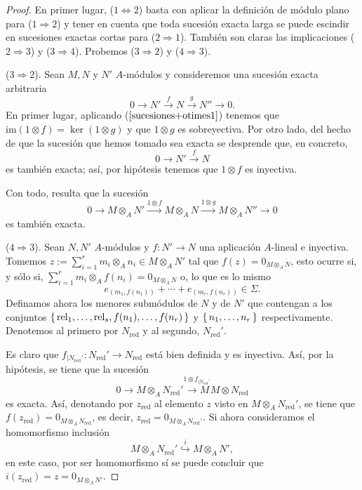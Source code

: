 \documentclass[../main.tex]{subfiles}
\begin{document}
\begin{proof}
	En primer lugar, ($1\Leftrightarrow 2$) basta con aplicar la definición de módulo plano para ($1\Rightarrow2$) y tener en cuenta que toda sucesión exacta larga se puede escindir en sucesiones exactas cortas para ($2\Rightarrow1$). También son claras las implicaciones ($2\Rightarrow3$) y ($3\Rightarrow4$). Probemos ($3\Rightarrow2$) y ($4\Rightarrow3$).
	
	($3\Rightarrow2$). Sean $M,N$ y $N'$ $A$-módulos y consideremos una sucesión exacta arbitraria $$0\longrightarrow N'\overset{f}{\longrightarrow}N\overset{g}{\longrightarrow}N''\longrightarrow 0.$$
	En primer lugar, aplicando ($\ref{sucesiones+otimes1}$) tenemos que $\text{im}(1\otimes f)=\ker{(1\otimes g)}$ y que $1\otimes g$ es sobreyectiva. Por otro lado, del hecho de que la sucesión que hemos tomado sea exacta se desprende que, en concreto,$$0\longrightarrow N'\overset{f}{\longrightarrow}N$$es también exacta; así, por hipótesis tenemos que $1\otimes f$ es inyectiva.
	
	Con todo, resulta que la sucesión $$0\longrightarrow M\otimes_AN'\overset{1\otimes f}{\longrightarrow}M\otimes_AN\overset{1\otimes g}{\longrightarrow}M\otimes_AN''\longrightarrow 0$$ es también exacta.
	
	($4\Rightarrow3$). Sean $N,N'$ $A$-módulos y $f:N'\longrightarrow N$ una aplicación $A$-lineal e inyectiva. Tomemos $z:=\sum_{i=1}^r m_i\otimes_A n_i\in M\otimes_A N'$ tal que $f(z)=0_{M\otimes_A N}$, esto ocurre si, y sólo si, $\sum_{i=1}^r m_i\otimes_Af(n_i)=0_{M\otimes_A N}$ o, lo que es lo mismo $$e_{(m_1,f(n_1))}+\cdots+e_{(m_r,f(n_r))}\in\Sigma.$$
	Definamos ahora los menores submódulos de $N$ y de $N'$ que contengan a los conjuntos $\set{\text{rel}_1,\dots,\text{rel}_s,f(n_1),\dots,f(n_r)}$ y $\set{n_1,\dots,n_r}$ respectivamente. Denotemos al primero por $N_{\text{red}}$ y al segundo, ${N_{\text{red}}}'$.
	
	Es claro que $f_{|{N_{\text{red}}}'}:{N_{\text{red}}}'\longrightarrow N_{\text{red}}$ está bien definida y es inyectiva. Así, por la hipótesis, se tiene que la sucesión $$0\longrightarrow M\otimes_A {N_{\text{red}}}'\overset{1\otimes f_{|{N_{\text{red}}}'}}{\longrightarrow M}M\otimes {N_{\text{red}}}$$ es exacta. 
	Así, denotando por $z_\text{red}$ al elemento $z$ visto en $M\otimes_A {N_{\text{red}}}'$, se tiene que $f(z_\text{red})=0_{M\otimes_A {N_{\text{red}}}}$, es decir, $z_\text{red}=0_{M\otimes_A {N_{\text{red}}}'}$.
	Si ahora consideramos el homomorfismo inclusión $$M\otimes_A {N_{\text{red}}}'\overset{i}{\hookrightarrow} M\otimes_A {N'},$$
	en este caso, por ser homomorfismo sí se puede concluir que $i(z_\text{red})=z=0_{M\otimes_A {N}'}.$
\end{proof}
\end{document}
